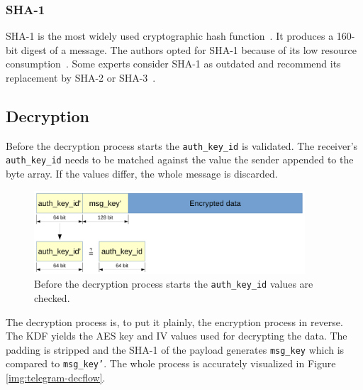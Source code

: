 \documentclass[thesis=M,english]{FITthesis}[2012/10/20]
\begin{document}
\subsubsection{SHA-1}

SHA-1 is the most widely used cryptographic hash function~\cite{understanding-crypto}. It produces a 160-bit digest of a message. The authors opted for SHA-1 because of its low resource consumption~\cite{telegram-sha1}. Some experts consider SHA-1 as outdated and recommend its replacement by SHA-2 or SHA-3~\cite{telegram-sha1}.

\subsection{Decryption}\label{crypto-regular-dec}

Before the decryption process starts the \texttt{auth\_key\_id} is validated. The receiver's \texttt{auth\_key\_id} needs to be matched against the value the sender appended to the byte array. If the values differ, the whole message is discarded.

\begin{figure}[htb]
	\centering
	\includegraphics[width=0.9\textwidth]{mtproto-auth-key.pdf}
	\caption[Message acceptance check]{Before the decryption process starts the \texttt{auth\_key\_id} values are checked.}
	\label{img:crypto-regular-dec}
\end{figure}

The decryption process is, to put it plainly, the encryption process in reverse. The KDF yields the AES key and IV values used for decrypting the data. The padding is stripped and the SHA-1 of the payload generates \texttt{msg\_key} which is compared to \texttt{msg\_key'}. The whole process is accurately visualized in Figure \ref{img:telegram-decflow}.
\end{document}
